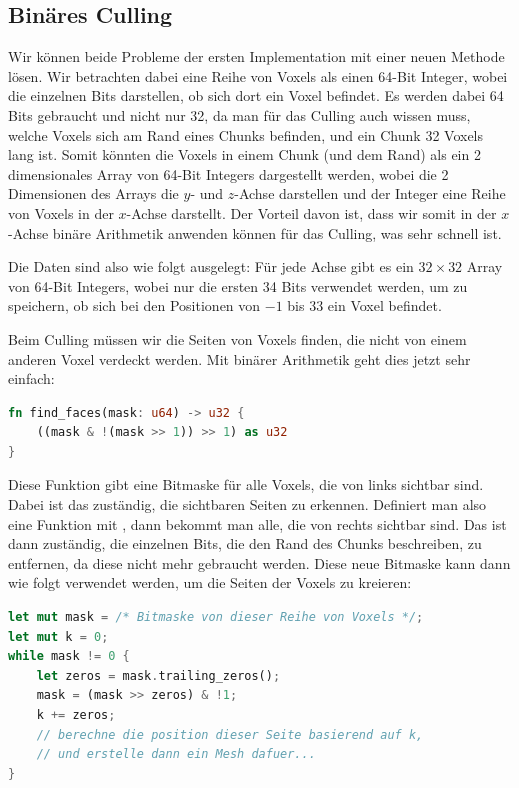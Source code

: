 \subsection{Binäres Culling}

Wir können beide Probleme der ersten Implementation
mit einer neuen Methode lösen.
Wir betrachten dabei eine Reihe von Voxels als einen
64-Bit Integer, wobei die einzelnen Bits darstellen,
ob sich dort ein Voxel befindet.
Es werden dabei 64 Bits gebraucht und nicht nur 32,
da man für das Culling auch wissen muss,
welche Voxels sich am Rand eines Chunks befinden,
und ein Chunk 32 Voxels lang ist.
Somit könnten die Voxels in einem Chunk
(und dem Rand) als ein 2 dimensionales
Array von 64-Bit Integers dargestellt werden,
wobei die 2 Dimensionen des Arrays die
$y$- und $z$-Achse darstellen und der Integer eine
Reihe von Voxels in der $x$-Achse darstellt.
Der Vorteil davon ist, dass wir somit in der
$x$-Achse binäre Arithmetik anwenden können für
das Culling, was sehr schnell ist.

Die Daten sind also wie folgt ausgelegt:
Für jede Achse gibt es ein $32 \times 32$ Array
von 64-Bit Integers, wobei nur die ersten 34 Bits
verwendet werden, um zu speichern, ob sich bei den
Positionen von $-1$ bis $33$ ein Voxel befindet.

Beim Culling müssen wir die Seiten von
Voxels finden, die nicht von einem anderen Voxel
verdeckt werden.
Mit binärer Arithmetik geht dies jetzt sehr einfach:

\begin{lstlisting}[language=Rust]
fn find_faces(mask: u64) -> u32 {
	((mask & !(mask >> 1)) >> 1) as u32
}
\end{lstlisting}
%
Diese Funktion gibt eine Bitmaske für alle Voxels,
die von links sichtbar sind.
Dabei ist das  zuständig,
die sichtbaren Seiten zu erkennen.
Definiert man also eine Funktion mit
, dann bekommt man alle,
die von rechts sichtbar sind.
Das  ist dann zuständig,
die einzelnen Bits, die den Rand des Chunks beschreiben,
zu entfernen, da diese nicht mehr gebraucht werden.
Diese neue Bitmaske kann dann wie folgt verwendet
werden, um die Seiten der Voxels zu kreieren:

\begin{lstlisting}[language=Rust]
let mut mask = /* Bitmaske von dieser Reihe von Voxels */;
let mut k = 0;
while mask != 0 {
	let zeros = mask.trailing_zeros();
	mask = (mask >> zeros) & !1;
	k += zeros;
	// berechne die position dieser Seite basierend auf k,
	// und erstelle dann ein Mesh dafuer...
}
\end{lstlisting}


